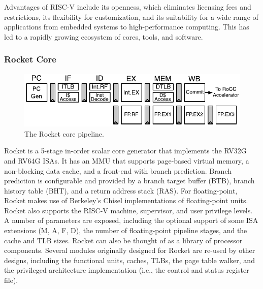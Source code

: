 Advantages of RISC-V include its openness, which eliminates licensing fees and restrictions, its flexibility for customization, and its suitability for a wide range of applications from embedded systems to high-performance computing. This has led to a rapidly growing ecosystem of cores, tools, and software.

\subsubsection{Rocket Core}

\begin{figure}[htbp]
    \centering
    \includegraphics[width=0.75\linewidth]{Images/03_RocketCore_RISCV_Rocket5Pipeline.pdf}
    \caption{The Rocket core pipeline.}
    \label{fig:rocket_core_pipeline}
\end{figure}

Rocket is a 5-stage in-order scalar core generator that implements the RV32G and RV64G ISAs. It has an MMU that supports page-based virtual memory, a non-blocking data cache, and a front-end with branch prediction. Branch prediction is configurable and provided by a branch target buffer (BTB), branch history table (BHT), and a return address stack (RAS). For ﬂoating-point, Rocket makes use of Berkeley's Chisel implementations of floating-point units. Rocket also supports the RISC-V machine, supervisor, and user privilege levels. A number of parameters are exposed, including the optional support of some ISA extensions (M, A, F, D), the number of ﬂoating-point pipeline stages, and the cache and TLB sizes.
Rocket can also be thought of as a library of processor components. Several modules originally designed for Rocket are re-used by other designs, including the functional units, caches, TLBs, the page table walker, and the privileged architecture implementation (i.e., the control and status register file).

